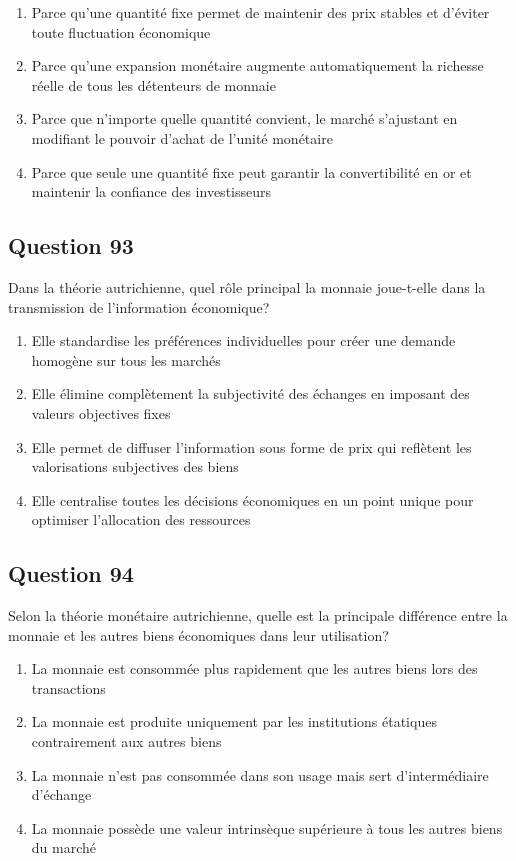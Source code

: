 \documentclass[12pt,a4paper]{article}
\begin{document}
\begin{enumerate}[label=\Alph*., leftmargin=*]
\item Parce qu'une quantité fixe permet de maintenir des prix stables et d'éviter toute fluctuation économique
\item Parce qu'une expansion monétaire augmente automatiquement la richesse réelle de tous les détenteurs de monnaie
\item Parce que n'importe quelle quantité convient, le marché s'ajustant en modifiant le pouvoir d'achat de l'unité monétaire
\item Parce que seule une quantité fixe peut garantir la convertibilité en or et maintenir la confiance des investisseurs
\end{enumerate}

\bigskip


\subsection*{Question 93}
Dans la théorie autrichienne, quel rôle principal la monnaie joue-t-elle dans la transmission de l'information économique?

\begin{enumerate}[label=\Alph*., leftmargin=*]
\item Elle standardise les préférences individuelles pour créer une demande homogène sur tous les marchés
\item Elle élimine complètement la subjectivité des échanges en imposant des valeurs objectives fixes
\item Elle permet de diffuser l'information sous forme de prix qui reflètent les valorisations subjectives des biens
\item Elle centralise toutes les décisions économiques en un point unique pour optimiser l'allocation des ressources
\end{enumerate}

\bigskip


\subsection*{Question 94}
Selon la théorie monétaire autrichienne, quelle est la principale différence entre la monnaie et les autres biens économiques dans leur utilisation?

\begin{enumerate}[label=\Alph*., leftmargin=*]
\item La monnaie est consommée plus rapidement que les autres biens lors des transactions
\item La monnaie est produite uniquement par les institutions étatiques contrairement aux autres biens
\item La monnaie n'est pas consommée dans son usage mais sert d'intermédiaire d'échange
\item La monnaie possède une valeur intrinsèque supérieure à tous les autres biens du marché
\end{enumerate}
\end{document}
